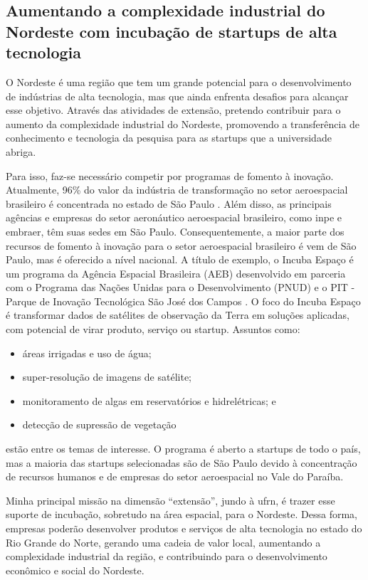 \documentclass{article}
\begin{document}
\subsection{Aumentando a complexidade industrial do Nordeste com incubação de startups de alta tecnologia}

O Nordeste é uma região que tem um grande potencial para o desenvolvimento de indústrias de alta tecnologia, mas que ainda enfrenta desafios para alcançar esse objetivo. Através das atividades de extensão, pretendo contribuir para o aumento da complexidade industrial do Nordeste, promovendo a transferência de conhecimento e tecnologia da pesquisa para as startups que a universidade abriga.

Para isso, faz-se necessário competir por programas de fomento à inovação. Atualmente, 96\% do valor da indústria de transformação no setor aeroespacial brasileiro é concentrada no estado de São Paulo \cite{investsp_setores_negocios}. Além disso, as principais agências e empresas do setor aeronáutico aeroespacial brasileiro, como \gls{inpe} e \gls{embraer}, têm suas sedes em São Paulo. Consequentemente, a maior parte dos recursos de fomento à inovação para o setor aeroespacial brasileiro é vem de São Paulo, mas é oferecido a nível nacional. A título de exemplo, o Incuba Espaço é um programa da  Agência Espacial Brasileira (AEB) desenvolvido em parceria com o Programa das Nações Unidas para o Desenvolvimento (PNUD) e o PIT - Parque de Inovação Tecnológica São José dos Campos \cite{mundogeo_incuba_espaco_2026}. O foco do Incuba Espaço é transformar dados de satélites de observação da Terra em soluções aplicadas, com potencial de virar produto, serviço ou startup. Assuntos como:
\begin{itemize}
    \item áreas irrigadas e uso de água;
    \item super-resolução de imagens de satélite;
    \item monitoramento de algas em reservatórios e hidrelétricas; e
    \item detecção de supressão de vegetação
\end{itemize}
estão entre os temas de interesse. O programa é aberto a startups de todo o país, mas a maioria das startups selecionadas são de São Paulo devido à concentração de recursos humanos e de empresas do setor aeroespacial no Vale do Paraíba.

Minha principal missão na dimensão ``extensão'', jundo à \gls{ufrn}, é trazer esse suporte de incubação, sobretudo na área espacial, para o Nordeste. Dessa forma, empresas poderão desenvolver produtos e serviços de alta tecnologia no estado do Rio Grande do Norte, gerando uma cadeia de valor local, aumentando a complexidade industrial da região, e contribuindo para o desenvolvimento econômico e social do Nordeste.
\end{document}
